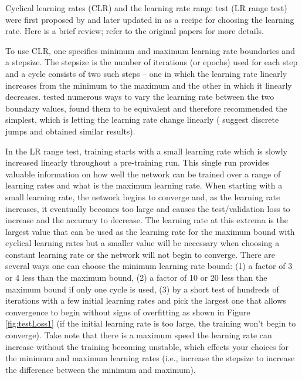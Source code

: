 \documentclass{article} %
\begin{document}
Cyclical learning rates (CLR) and the learning rate range test (LR range test) were first proposed by \cite{smith2015no} and later updated in \cite{smith2017cyclical} as a recipe for choosing the learning rate.  Here is a brief review; refer to the  original papers for more details.

To use CLR, one specifies minimum and maximum learning rate boundaries and a stepsize.  The stepsize is the number of iterations (or epochs) used for each step and a cycle consists of two such steps -- one in which the learning rate linearly increases from the minimum to the maximum and the other in which it linearly decreases.  \cite{smith2015no} tested numerous ways to vary the learning rate between the two boundary values, found them to be equivalent  and therefore recommended the simplest, which is letting the learning rate change linearly (\cite{jastrzkebski2017three} suggest discrete jumps and obtained similar results).  

In the LR range test, training starts with a small learning rate which is slowly increased linearly throughout a  pre-training run.  This single run provides valuable information on how well the network can be trained over a range of learning rates and what is the maximum learning rate.   When starting with a small learning rate, the network begins to converge and, as the learning rate increases, it eventually becomes too large and causes the test/validation loss to increase and the accuracy to decrease. The learning rate at this extrema is the largest value that can be used as the  learning rate for the maximum bound with cyclical learning rates but a smaller value will be necessary when choosing a constant learning rate or the network will not begin to converge.  There are several ways one can choose the minimum learning rate bound: (1) a factor of 3 or 4 less than the maximum bound, (2) a factor of 10 or 20 less than the maximum bound if only one cycle is used, (3)  by a short test of hundreds of iterations with a few initial learning rates and pick the largest one that allows convergence to begin without signs of overfitting as shown in Figure \ref{fig:testLoss1} (if the initial learning rate is too large, the training won't begin to converge).  Take note that there is a maximum speed the learning rate can increase without the training becoming unstable, which effects your choices for the minimum and maximum learning rates (i.e., increase the stepsize to increase the difference between the minimum and maximum).
\end{document}
